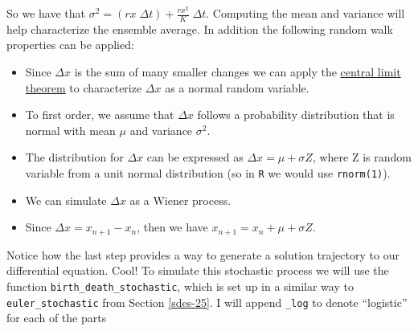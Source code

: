 \documentclass[
]{book}
\providecommand{\tightlist}{%
  \setlength{\itemsep}{0pt}\setlength{\parskip}{0pt}}
\theoremstyle{definition}
\theoremstyle{definition}
\theoremstyle{definition}
\theoremstyle{remark}
\begin{document}
So we have that \(\displaystyle \sigma^{2} = \left( r x \; \Delta t \right) + \frac{rx^{2}}{K} \; \Delta t\). Computing the mean and variance will help characterize the ensemble average. In addition the following random walk properties can be applied:

\begin{itemize}
\tightlist
\item
  Since \(\Delta x\) is the sum of many smaller changes we can apply the \href{https://en.wikipedia.org/wiki/Central_limit_theorem}{central limit theorem} to characterize \(\Delta x\) as a normal random variable.
\item
  To first order, we assume that \(\Delta x\) follows a probability distribution that is normal with mean \(\mu\) and variance \(\sigma^{2}\).
\item
  The distribution for \(\Delta x\) can be expressed as \(\Delta x = \mu + \sigma Z\), where Z is random variable from a unit normal distribution (so in \texttt{R} we would use \texttt{rnorm(1)}).
\item
  We can simulate \(\Delta x\) as a Wiener process.
\item
  Since \(\Delta x = x_{n+1}-x_{n}\), then we have \(x_{n+1} = x_{n} + \mu + \sigma Z\).
\end{itemize}

Notice how the last step provides a way to generate a solution trajectory to our differential equation. Cool! To simulate this stochastic process we will use the function \texttt{birth\_death\_stochastic}, which is set up in a similar way to \texttt{euler\_stochastic} from Section \ref{sdes-25}. I will append \texttt{\_log} to denote ``logistic'' for each of the parts
\end{document}
